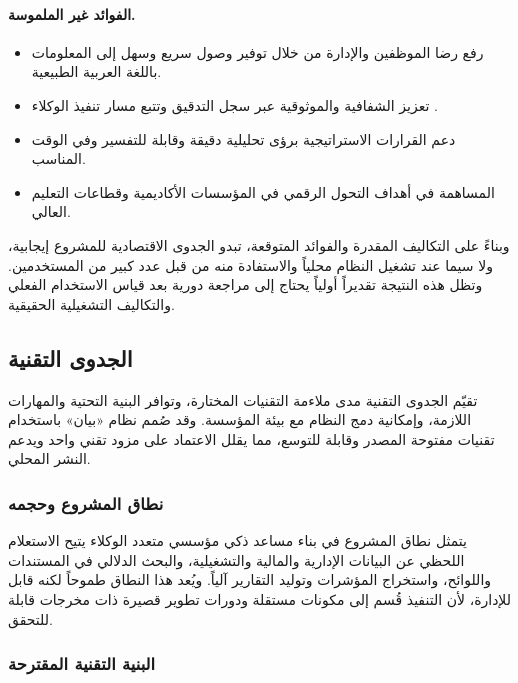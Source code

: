 \paragraph{الفوائد غير الملموسة.}
\begin{itemize}[label=\textcolor{kauprimary}{$\blacktriangleright$},leftmargin=*]
  \item رفع رضا الموظفين والإدارة من خلال توفير وصول سريع وسهل إلى المعلومات باللغة العربية الطبيعية.
  \item تعزيز الشفافية والموثوقية عبر سجل التدقيق  وتتبع مسار تنفيذ الوكلاء .
  \item دعم القرارات الاستراتيجية برؤى تحليلية دقيقة وقابلة للتفسير وفي الوقت المناسب.
  \item المساهمة في أهداف التحول الرقمي في المؤسسات الأكاديمية وقطاعات التعليم العالي.
\end{itemize}

وبناءً على التكاليف المقدرة والفوائد المتوقعة، تبدو الجدوى الاقتصادية للمشروع إيجابية، ولا سيما عند تشغيل النظام محلياً والاستفادة منه من قبل عدد كبير من المستخدمين. وتظل هذه النتيجة تقديراً أولياً يحتاج إلى مراجعة دورية بعد قياس الاستخدام الفعلي والتكاليف التشغيلية الحقيقية.

\subsection{الجدوى التقنية}
\label{subsec:technical-feasibility}

تقيّم الجدوى التقنية مدى ملاءمة التقنيات المختارة، وتوافر البنية التحتية والمهارات اللازمة، وإمكانية دمج النظام مع بيئة المؤسسة. وقد صُمم نظام «بيان» باستخدام تقنيات مفتوحة المصدر وقابلة للتوسع، مما يقلل الاعتماد على مزود تقني واحد ويدعم النشر المحلي.

\subsubsection{نطاق المشروع وحجمه}
\label{subsubsec:project-size}

يتمثل نطاق المشروع في بناء مساعد ذكي مؤسسي متعدد الوكلاء يتيح الاستعلام اللحظي عن البيانات الإدارية والمالية والتشغيلية، والبحث الدلالي في المستندات واللوائح، واستخراج المؤشرات وتوليد التقارير آلياً. ويُعد هذا النطاق طموحاً لكنه قابل للإدارة، لأن التنفيذ قُسم إلى مكونات مستقلة ودورات تطوير قصيرة ذات مخرجات قابلة للتحقق.

\subsubsection{البنية التقنية المقترحة}
\label{subsubsec:technical-architecture-feasibility}

